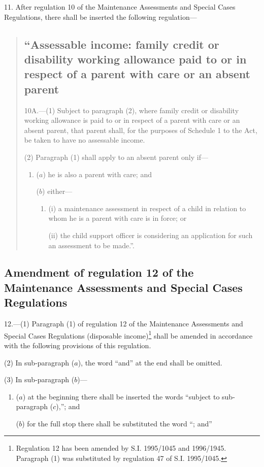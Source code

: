 \documentclass[12pt,a4paper]{article}
\begin{document}
11.  After regulation 10 of the Maintenance Assessments and Special Cases Regulations, there shall be inserted the following regulation—
\begin{quotation}
\subsection*{\sloppy “Assessable income: family credit or disability working allowance paid to or in respect of a parent with care or an absent parent}

10A.—(1) Subject to paragraph (2), where family credit or disability working allowance is paid to or in respect of a parent with care or an absent parent, that parent shall, for the purposes of Schedule 1 to the Act, be taken to have no assessable income.

(2) Paragraph (1) shall apply to an absent parent only if—
\begin{enumerate}\item[]
($a$) he is also a parent with care; and

($b$) either—
\begin{enumerate}\item[]
(i) a maintenance assessment in respect of a child in relation to whom he is a parent with care is in force; or

(ii) the child support officer is considering an application for such an assessment to be made.”.
\end{enumerate}
\end{enumerate}
\end{quotation}

\subsection[12. Amendment of regulation 12 of the Maintenance Assessments and Special Cases Regulations]{Amendment of regulation 12 of the Maintenance Assessments and Special Cases Regulations}

12.—(1) Paragraph (1) of regulation 12 of the Maintenance Assessments and Special Cases Regulations (disposable income)\footnote{\frenchspacing Regulation 12 has been amended by S.I. 1995/1045 and 1996/1945. Paragraph (1) was substituted by regulation 47 of S.I. 1995/1045.} shall be amended in accordance with the following provisions of this regulation.

(2) In sub-paragraph ($a$), the word “and” at the end shall be omitted.

(3) In sub-paragraph ($b$)—
\begin{enumerate}\item[]
($a$) at the beginning there shall be inserted the words “subject to sub-paragraph ($c$),”; and

($b$) for the full stop there shall be substituted the word “; and”
\end{enumerate}
\end{document}
